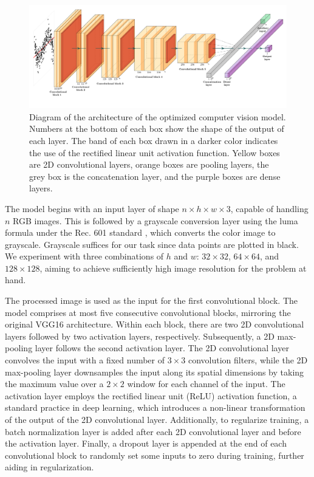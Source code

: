 \documentclass[]{interact}
\theoremstyle{plain}%
\theoremstyle{definition}
\theoremstyle{remark}
\begin{document}
\begin{figure}[!h]

{\centering \includegraphics[width=1\linewidth]{paper_files/figure-latex/cnn-diag-1} 

}

\caption{Diagram of the architecture of the optimized computer vision model. Numbers at the bottom of each box show the shape of the output of each layer. The band of each box drawn in a darker color indicates the use of the rectified linear unit activation function.  Yellow boxes are 2D convolutional layers, orange boxes are pooling layers, the grey box is the concatenation layer, and the purple boxes are dense layers.}\label{fig:cnn-diag}
\end{figure}

The model begins with an input layer of shape
\(n \times h \times w \times 3\), capable of handling \(n\) RGB images.
This is followed by a grayscale conversion layer using the luma formula
under the Rec. 601 standard \citep{series2011studio}, which converts the
color image to grayscale. Grayscale suffices for our task since data
points are plotted in black. We experiment with three combinations of
\(h\) and \(w\): \(32 \times 32\), \(64 \times 64\), and
\(128 \times 128\), aiming to achieve sufficiently high image resolution
for the problem at hand.

The processed image is used as the input for the first convolutional
block. The model comprises at most five consecutive convolutional
blocks, mirroring the original VGG16 architecture. Within each block,
there are two 2D convolutional layers followed by two activation layers,
respectively. Subsequently, a 2D max-pooling layer follows the second
activation layer. The 2D convolutional layer convolves the input with a
fixed number of \(3 \times 3\) convolution filters, while the 2D
max-pooling layer downsamples the input along its spatial dimensions by
taking the maximum value over a \(2 \times 2\) window for each channel
of the input. The activation layer employs the rectified linear unit
(ReLU) activation function, a standard practice in deep learning, which
introduces a non-linear transformation of the output of the 2D
convolutional layer. Additionally, to regularize training, a batch
normalization layer is added after each 2D convolutional layer and
before the activation layer. Finally, a dropout layer is appended at the
end of each convolutional block to randomly set some inputs to zero
during training, further aiding in regularization.
\end{document}
